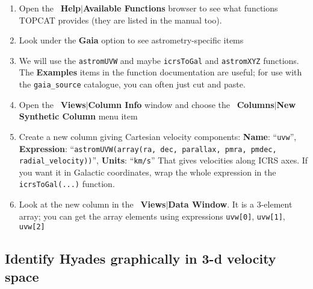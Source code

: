 \documentclass{article}
\newcommand{\buttimg}[1]
           {\mbox{\vtop{\vskip-2ex\hbox{\texttt{[image: \#1]}}}}}
\newcommand{\winfig}[2]
           {\vspace*{-0.5cm}
            \hspace*{0.5cm}\mbox{\vtop{\hbox{\texttt{[image: \#2]}}}}}
\newcommand{\lab}[1]{{\bf #1}}
\newcommand{\mb}[3]{\buttimg{#1}~\lab{#2}$\mid$\lab{#3}}
\newcommand{\entry}[2]{\lab{#1}: ``{\tt #2}''}
\begin{document}
\begin{minipage}[t]{11cm}
  \raggedright
  \begin{enumerate}
  \item Open the \mb{fx_button}{Help}{Available Functions} browser to see
        what functions TOPCAT provides (they are listed in the manual too).
  \item Look under the \lab{Gaia} option to see astrometry-specific items
  \item We will use the {\tt astromUVW} and maybe {\tt icrsToGal}
        and {\tt astromXYZ} functions.
        The \lab{Examples} items in the function documentation are useful;
        for use with the {\tt gaia\_source} catalogue,
        you can often just cut and paste.
  \item Open the \mb{cols_button.png}{Views}{Column Info} window
        and choose the \mb{plus_button.png}{Columns}{New Synthetic Column}
        menu item
  \item Create a new column giving Cartesian velocity components:
        \entry{Name}{uvw},
        \entry{Expression}
          {astromUVW(array(ra, dec, parallax, pmra, pmdec, radial\_velocity))},
        \entry{Units}{km/s}
        That gives velocities along ICRS axes.
        If you want it in Galactic coordinates, wrap the whole expression
        in the {\tt icrsToGal(...)} function.
  \item Look at the new column in the \mb{browser1.png}{Views}{Data Window}.
        It is a 3-element array; you can get the array elements
        using expressions {\tt uvw[0]}, {\tt uvw[1]}, {\tt uvw[2]}
  \end{enumerate}
\end{minipage}
\begin{minipage}[t]{8cm}
  \winfig{width=8cm}{hy_coldef.png}
\end{minipage}

\subsection{Identify Hyades graphically in 3-d velocity space}
\end{document}
